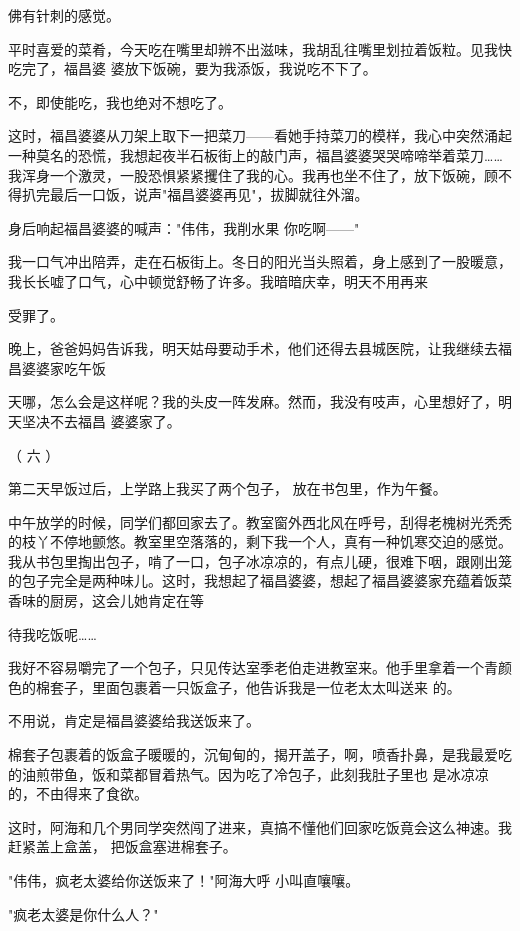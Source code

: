 \documentclass{article}
\begin{document}
\newpage
佛有针刺的感觉。 

平时喜爱的菜肴，今天吃在嘴里却辨不出滋味，我胡乱往嘴里划拉着饭粒。见我快吃完了，福昌婆
婆放下饭碗，要为我添饭，我说吃不下了。 


不，即使能吃，我也绝对不想吃了。 

这时，福昌婆婆从刀架上取下一把菜刀——看她手持菜刀的模样，我心中突然涌起一种莫名的恐慌，我想起夜半石板街上的敲门声，福昌婆婆哭哭啼啼举着菜刀……我浑身一个激灵，一股恐惧紧紧攫住了我的心。我再也坐不住了，放下饭碗，顾不得扒完最后一口饭，说声"福昌婆婆再见"，拔脚就往外溜。

身后响起福昌婆婆的喊声："伟伟，我削水果
你吃啊——" 

我一口气冲出陪弄，走在石板街上。冬日的阳光当头照着，身上感到了一股暖意，我长长嘘了口气，心中顿觉舒畅了许多。我暗暗庆幸，明天不用再来

\newpage
受罪了。 

晚上，爸爸妈妈告诉我，明天姑母要动手术，他们还得去县城医院，让我继续去福昌婆婆家吃午饭

天哪，怎么会是这样呢？我的头皮一阵发麻。然而，我没有吱声，心里想好了，明天坚决不去福昌
婆婆家了。 


（ 六 ） 

第二天早饭过后，上学路上我买了两个包子，
放在书包里，作为午餐。 

中午放学的时候，同学们都回家去了。教室窗外西北风在呼号，刮得老槐树光秃秃的枝丫不停地颤悠。教室里空落落的，剩下我一个人，真有一种饥寒交迫的感觉。我从书包里掏出包子，啃了一口，包子冰凉凉的，有点儿硬，很难下咽，跟刚出笼的包子完全是两种味儿。这时，我想起了福昌婆婆，想起了福昌婆婆家充蕴着饭菜香味的厨房，这会儿她肯定在等

\newpage
待我吃饭呢…… 

我好不容易嚼完了一个包子，只见传达室季老伯走进教室来。他手里拿着一个青颜色的棉套子，里面包裹着一只饭盒子，他告诉我是一位老太太叫送来
的。 


不用说，肯定是福昌婆婆给我送饭来了。 

棉套子包裹着的饭盒子暖暖的，沉甸甸的，揭开盖子，啊，喷香扑鼻，是我最爱吃的油煎带鱼，饭和菜都冒着热气。因为吃了冷包子，此刻我肚子里也
是冰凉凉的，不由得来了食欲。 

这时，阿海和几个男同学突然闯了进来，真搞不懂他们回家吃饭竟会这么神速。我赶紧盖上盒盖，
把饭盒塞进棉套子。 

"伟伟，疯老太婆给你送饭来了！"阿海大呼
小叫直嚷嚷。 


\newpage

"疯老太婆是你什么人？" 
\end{document}
